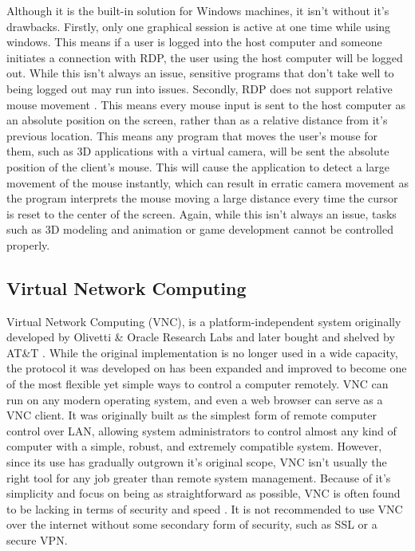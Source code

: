Although it is the built-in solution for Windows machines, it isn't without it's drawbacks.
Firstly, only one graphical session is active at one time while using windows.
This means if a user is logged into the host computer and someone initiates a connection with RDP, the user using the host computer will be logged out.
While this isn't always an issue, sensitive programs that don't take well to being logged out may run into issues.
Secondly, RDP does not support relative mouse movement \cite{burgin_2013}.
This means every mouse input is sent to the host computer as an absolute position on the screen, rather than as a relative distance from it's previous location.
This means any program that moves the user's mouse for them, such as 3D applications with a virtual camera, will be sent the absolute position of the client's mouse.
This will cause the application to detect a large movement of the mouse instantly, which can result in erratic camera movement as the program interprets the mouse moving a large distance every time the cursor is reset to the center of the screen.
Again, while this isn't always an issue, tasks such as 3D modeling and animation or game development cannot be controlled properly.


\subsection{Virtual Network Computing}\label{subsec:VirtualNetworkComputing}

Virtual Network Computing (VNC), is a platform-independent system originally developed by Olivetti \& Oracle Research Labs and later bought and shelved by AT\&T \cite{vncFlavors}.
While the original implementation is no longer used in a wide capacity, the protocol it was developed on has been expanded and improved to become one of the most flexible yet simple ways to control a computer remotely.
VNC can run on any modern operating system, and even a web browser can serve as a VNC client.
It was originally built as the simplest form of remote computer control over LAN, allowing system administrators to control almost any kind of computer with a simple, robust, and extremely compatible system.
However, since its use has gradually outgrown it's original scope, VNC isn't usually the right tool for any job greater than remote system management.
Because of it's simplicity and focus on being as straightforward as possible, VNC is often found to be lacking in terms of security and speed \cite{vncFlavors}.
It is not recommended to use VNC over the internet without some secondary form of security, such as SSL or a secure VPN.


